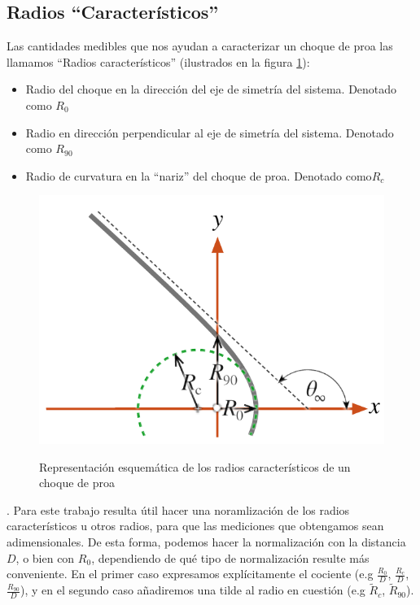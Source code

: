 \subsection{Radios ``Característicos''}
\label{sec:char-rad}
Las cantidades medibles que nos ayudan a caracterizar un choque de proa las
llamamos ``Radios característicos'' (ilustrados en la figura
\ref{fig:char-radii}):
\begin{itemize}
\item Radio del choque en la dirección del eje de simetría del sistema.
  Denotado como $R_0$
\item Radio en dirección perpendicular al eje de simetría del sistema.
  Denotado como $R_{90}$
\item Radio de curvatura en la ``nariz'' del choque de proa. Denotado
  como$ R_c$
\end{itemize}

\begin{figure}
  \includegraphics[width=\linewidth]{./Figures/characteristic-radii}
  \label{fig:char-radii}
  \caption{Representación esquemática de los radios característicos
  de un choque de proa}
\end{figure}.
Para este trabajo resulta útil hacer una noramlización de los radios
característicos u otros radios, para que las mediciones que obtengamos
sean adimensionales. De esta forma, podemos hacer la normalización con
la distancia $D$, o bien con $R_0$, dependiendo de qué tipo de
normalización resulte más conveniente. En el primer caso expresamos
explícitamente el cociente (e.g $\frac{R_0}{D}$, $\frac{R_c}{D}$,
$\frac{R_{90}}{D}$), y en el segundo caso añadiremos una tilde al
radio en cuestión (e.g $\tilde{R}_c$, $\tilde{R}_{90}$).

